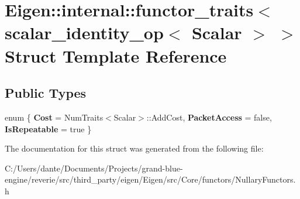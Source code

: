 \hypertarget{struct_eigen_1_1internal_1_1functor__traits_3_01scalar__identity__op_3_01_scalar_01_4_01_4}{}\section{Eigen\+::internal\+::functor\+\_\+traits$<$ scalar\+\_\+identity\+\_\+op$<$ Scalar $>$ $>$ Struct Template Reference}
\label{struct_eigen_1_1internal_1_1functor__traits_3_01scalar__identity__op_3_01_scalar_01_4_01_4}
\subsection*{Public Types}
\begin{DoxyCompactItemize}
\item 
\mbox{\label{struct_eigen_1_1internal_1_1functor__traits_3_01scalar__identity__op_3_01_scalar_01_4_01_4_a38e38d3598ca245b59c0433d611fbd68}} 
enum \{ {\bfseries Cost} = Num\+Traits$<$Scalar$>$\+::Add\+Cost, 
{\bfseries Packet\+Access} = false, 
{\bfseries Is\+Repeatable} = true
 \}
\end{DoxyCompactItemize}


The documentation for this struct was generated from the following file\+:\begin{DoxyCompactItemize}
\item 
C\+:/\+Users/dante/\+Documents/\+Projects/grand-\/blue-\/engine/reverie/src/third\+\_\+party/eigen/\+Eigen/src/\+Core/functors/Nullary\+Functors.\+h\end{DoxyCompactItemize}
